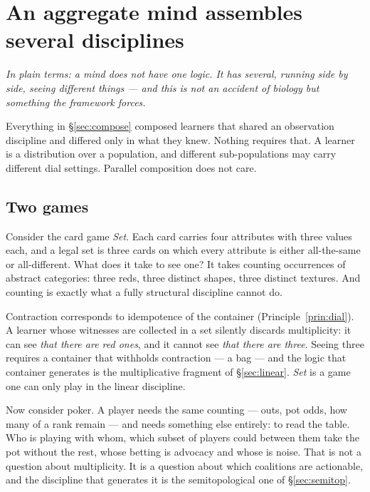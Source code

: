 \section{An aggregate mind assembles several disciplines}
\label{sec:aggregate}

\noindent\emph{In plain terms: a mind does not have one logic. It has several,
running side by side, seeing different things --- and this is not an accident of
biology but something the framework forces.}

Everything in \S\ref{sec:compose} composed learners that shared an observation
discipline and differed only in what they knew. Nothing requires that. A learner
is a distribution over a population, and different sub-populations may carry
different dial settings. Parallel composition does not care.

\subsection{Two games}

Consider the card game \emph{Set}. Each card carries four attributes with three
values each, and a legal set is three cards on which every attribute is either
all-the-same or all-different. What does it take to see one? It takes counting
occurrences of abstract categories: three reds, three distinct shapes, three
distinct textures. And counting is exactly what a fully structural discipline
cannot do.

\begin{observation}
\label{obs:counting}
Contraction corresponds to idempotence of the container
(Principle~\ref{prin:dial}). A learner whose witnesses are collected in a set
silently discards multiplicity: it can see \emph{that there are red ones}, and it
cannot see \emph{that there are three}. Seeing three requires a container that
withholds contraction --- a bag --- and the logic that container generates is the
multiplicative fragment of \S\ref{sec:linear}. \emph{Set} is a game one can only
play in the linear discipline.
\end{observation}

Now consider poker. A player needs the same counting --- outs, pot odds, how many
of a rank remain --- and needs something else entirely: to read the table. Who is
playing with whom, which subset of players could between them take the pot without
the rest, whose betting is advocacy and whose is noise. That is not a question
about multiplicity. It is a question about which coalitions are actionable, and
the discipline that generates it is the semitopological one of
\S\ref{sec:semitop}.

